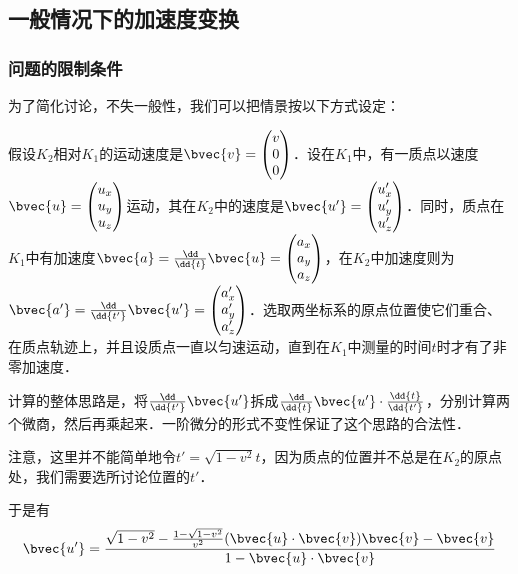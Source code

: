 

\subsection{一般情况下的加速度变换}
\subsubsection{问题的限制条件}

为了简化讨论，不失一般性，我们可以把情景按以下方式设定：

假设$K_2$相对$K_1$的运动速度是$\bvec{v}=\left(\begin{matrix}v\\0\\0\end{matrix} \right) $．设在$K_1$中，有一质点以速度$\bvec{u}=\left(\begin{matrix}u_x\\u_y\\u_z\end{matrix} \right)$运动，其在$K_2$中的速度是$\bvec{u'}=\left(\begin{matrix}u_x'\\u_y'\\u_z'\end{matrix} \right) $．同时，质点在$K_1$中有加速度$\bvec{a}=\frac{\dd}{\dd{t}}\bvec{u}=\left(\begin{matrix}a_x\\a_y\\a_z\end{matrix} \right)$，在$K_2$中加速度则为$\bvec{a'}=\frac{\dd}{\dd{t'}}\bvec{u'}=\left(\begin{matrix}a_x'\\a_y'\\a_z'\end{matrix} \right)$．选取两坐标系的原点位置使它们重合、在质点轨迹上，并且设质点一直以匀速运动，直到在$K_1$中测量的时间$t$时才有了非零加速度．

计算的整体思路是，将$\frac{\dd}{\dd{t'}}\bvec{u'}$拆成$\frac{\dd}{\dd{t}}\bvec{u'}\cdot\frac{\dd{t}}{\dd{t'}}$，分别计算两个微商，然后再乘起来．一阶微分的形式不变性保证了这个思路的合法性．

注意，这里并不能简单地令$t'=\sqrt{1-v^2}t$，因为质点的位置并不总是在$K_2$的原点处，我们需要选所讨论位置的$t'$．

于是有
\begin{equation}\label{SRAcc_eq2}
\bvec{u'}=\frac{\sqrt{1-v^2}-\frac{1-\sqrt{1-v^2}}{v^2}(\bvec{u}\cdot\bvec{v})\bvec{v}-\bvec{v}}{1-\bvec{u}\cdot\bvec{v}}
\end{equation}

